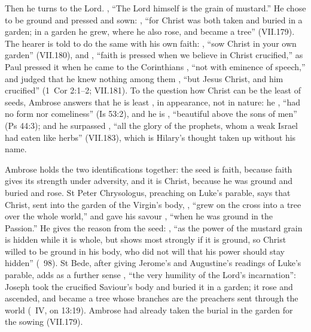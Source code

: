 Then he turns to the Lord. , ``The Lord
himself is the grain of mustard.'' He chose to be ground and pressed and sown:
, ``for Christ was both taken and buried in a
garden; in a garden he grew, where he also rose, and became a tree''
(VII.179). The hearer is told to do the same with his own faith: , ``sow Christ in your own garden'' (VII.180), and
, ``faith is pressed
when we believe in Christ crucified,'' as Paul pressed it when he came to the
Corinthians , ``not with eminence of
speech,'' and judged that he knew nothing among them , ``but Jesus Christ, and him crucified'' (1~Cor
2:1--2; VII.181). To
the question how Christ can be the least of seeds, Ambrose answers that he is
least , in appearance, not in nature: he , ``had no form nor comeliness'' (Is 53:2), and
he is , ``beautiful above the sons
of men'' (Ps 44:3);
and he surpassed , ``all the glory of the prophets, whom a weak Israel had
eaten like herbs'' (VII.183), which is Hilary's thought taken up without his
name.

Ambrose holds the two identifications together: the seed is faith, because
faith gives its strength under adversity, and it is Christ, because he was
ground and buried and rose. St Peter Chrysologus, preaching on Luke's parable, says that
Christ, sent into the garden of the Virgin's body, , ``grew on the cross into a tree over the whole world,'' and
gave his savour , ``when he was ground in the
Passion.'' He gives the reason from the seed: , ``as the power of the mustard grain is hidden while it is
whole, but shows most strongly if it is ground, so Christ willed to be ground
in his body, who did not will that his power should stay hidden''
(~98). St Bede, after giving Jerome's and Augustine's readings of
Luke's parable, adds as a further sense , ``the very humility of the Lord's incarnation'': Joseph took the
crucified Saviour's body and buried it in a garden; it rose and ascended, and
became a tree whose branches are the preachers sent through the world
(~IV, on 13:19). Ambrose had already taken the burial in the
garden for the sowing (VII.179).

